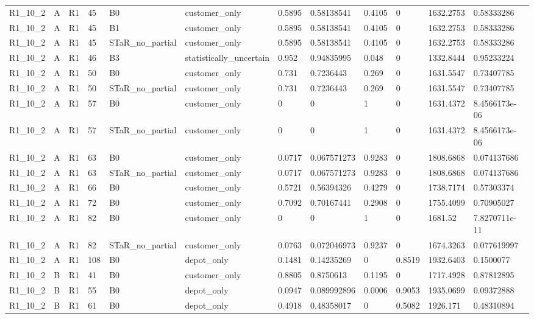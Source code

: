 \begin{longtable}{llllllllllll}
R1\_10\_2 & A & R1 & 45 & B0 & customer\_only & 0.5895 & 0.58138541 & 0.4105 & 0 & 1632.2753 & 0.58333286 \\
R1\_10\_2 & A & R1 & 45 & B1 & customer\_only & 0.5895 & 0.58138541 & 0.4105 & 0 & 1632.2753 & 0.58333286 \\
R1\_10\_2 & A & R1 & 45 & STaR\_no\_partial & customer\_only & 0.5895 & 0.58138541 & 0.4105 & 0 & 1632.2753 & 0.58333286 \\
R1\_10\_2 & A & R1 & 46 & B3 & statistically\_uncertain & 0.952 & 0.94835995 & 0.048 & 0 & 1332.8444 & 0.95233224 \\
R1\_10\_2 & A & R1 & 50 & B0 & customer\_only & 0.731 & 0.7236443 & 0.269 & 0 & 1631.5547 & 0.73407785 \\
R1\_10\_2 & A & R1 & 50 & STaR\_no\_partial & customer\_only & 0.731 & 0.7236443 & 0.269 & 0 & 1631.5547 & 0.73407785 \\
R1\_10\_2 & A & R1 & 57 & B0 & customer\_only & 0 & 0 & 1 & 0 & 1631.4372 & 8.4566173e-06 \\
R1\_10\_2 & A & R1 & 57 & STaR\_no\_partial & customer\_only & 0 & 0 & 1 & 0 & 1631.4372 & 8.4566173e-06 \\
R1\_10\_2 & A & R1 & 63 & B0 & customer\_only & 0.0717 & 0.067571273 & 0.9283 & 0 & 1808.6868 & 0.074137686 \\
R1\_10\_2 & A & R1 & 63 & STaR\_no\_partial & customer\_only & 0.0717 & 0.067571273 & 0.9283 & 0 & 1808.6868 & 0.074137686 \\
R1\_10\_2 & A & R1 & 66 & B0 & customer\_only & 0.5721 & 0.56394326 & 0.4279 & 0 & 1738.7174 & 0.57303374 \\
R1\_10\_2 & A & R1 & 72 & B0 & customer\_only & 0.7092 & 0.70167441 & 0.2908 & 0 & 1755.4099 & 0.70905027 \\
R1\_10\_2 & A & R1 & 82 & B0 & customer\_only & 0 & 0 & 1 & 0 & 1681.52 & 7.8270711e-11 \\
R1\_10\_2 & A & R1 & 82 & STaR\_no\_partial & customer\_only & 0.0763 & 0.072046973 & 0.9237 & 0 & 1674.3263 & 0.077619997 \\
R1\_10\_2 & A & R1 & 108 & B0 & depot\_only & 0.1481 & 0.14235269 & 0 & 0.8519 & 1932.6403 & 0.1500077 \\
R1\_10\_2 & B & R1 & 41 & B0 & customer\_only & 0.8805 & 0.8750613 & 0.1195 & 0 & 1717.4928 & 0.87812895 \\
R1\_10\_2 & B & R1 & 55 & B0 & depot\_only & 0.0947 & 0.089992896 & 0.0006 & 0.9053 & 1935.0699 & 0.09372888 \\
R1\_10\_2 & B & R1 & 61 & B0 & depot\_only & 0.4918 & 0.48358017 & 0 & 0.5082 & 1926.171 & 0.48310894 \\

\end{longtable}
